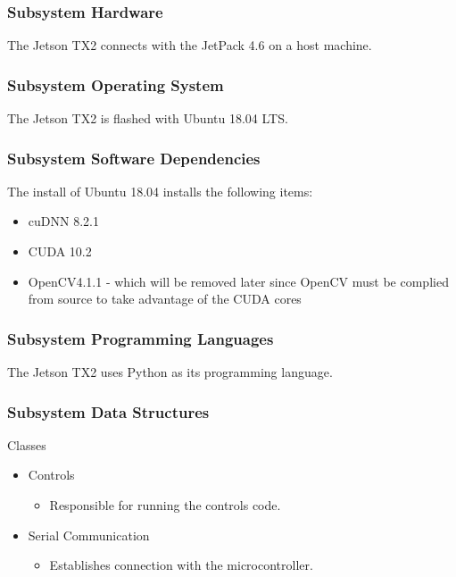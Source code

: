 \subsubsection{Subsystem Hardware}
The Jetson TX2 connects with the JetPack 4.6 on a host machine. 

\subsubsection{Subsystem Operating System}
The Jetson TX2 is flashed with Ubuntu 18.04 LTS.

\subsubsection{Subsystem Software Dependencies}
The install of Ubuntu 18.04 installs the following items:
\begin{itemize}
    \item cuDNN 8.2.1
    \item CUDA 10.2
    \item OpenCV4.1.1 - which will be removed later since OpenCV must be complied from source to take advantage of the CUDA cores
\end{itemize}

\subsubsection{Subsystem Programming Languages}
The Jetson TX2 uses Python as its programming language.

\subsubsection{Subsystem Data Structures}
Classes
\begin{itemize}
    \item Controls
    \begin{itemize}
        \item Responsible for running the controls code.
    \end{itemize}
    \item Serial Communication
    \begin{itemize}
        \item Establishes connection with the microcontroller.
    \end{itemize}
\end{itemize}

